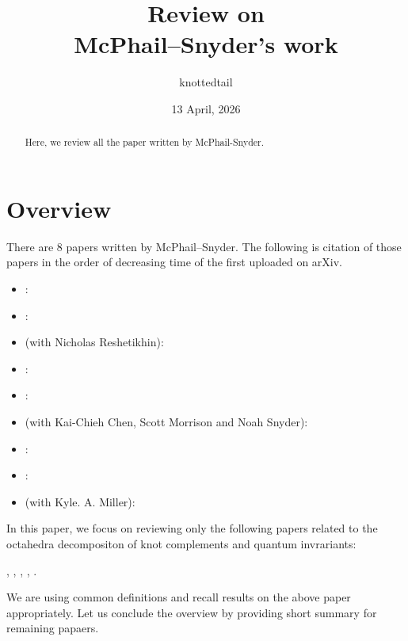 \documentclass[11pt]{amsart}
\title{Review on \\ McPhail--Snyder's work}
\author{knottedtail}
\date{13 April, 2026}
\begin{document}
\begin{abstract}
    Here, we review all the paper written by McPhail-Snyder.
\end{abstract}

\maketitle

\section{Overview}

There are 8 papers written by McPhail--Snyder.
The following is citation of those papers in the order of decreasing time of the first uploaded on arXiv.
\begin{itemize}
    \item \cite{McPhailSnyder-2026-stateintegral}: 
    \item \cite{McPhailSnyder-2025-quantization_tangle}: 
    \item \cite{McPhailSnyder_Reshetikhin-2025-cyclic_modules} (with Nicholas Reshetikhin): 
    \item \cite{McPhailSnyder-2025-octahedral_coordinates}: 
    \item \cite{McPhailSnyder-2026-hyperbolic_octa_quantum}: 
    \item \cite{Chen_McPhailSnyder_Morrison_Snyder-2021-Kashaev_Reshetikhin} (with Kai-Chieh Chen, Scott Morrison and Noah Snyder): 
    \item \cite[Thesis]{McPhailSnyder-2021-thesis}: 
    \item \cite{McPhailSnyder-2022-holonomy_torsion}: 
    \item \cite{McPhailSnyder_Miller-2020-planar_diagrams} (with Kyle. A. Miller): 
\end{itemize}

In this paper, we focus on reviewing only the following papers related to the octahedra decompositon of knot complements and quantum invrariants:
\begin{center}
    \cite{McPhailSnyder-2025-quantization_tangle}, 
    \cite{McPhailSnyder_Reshetikhin-2025-cyclic_modules}
    \cite{McPhailSnyder-2025-octahedral_coordinates},
    \cite{McPhailSnyder-2026-hyperbolic_octa_quantum}, 
    \cite{McPhailSnyder-2021-thesis},
    \cite{McPhailSnyder-2022-holonomy_torsion}.
\end{center}
We are using common definitions and recall results on the above paper appropriately.
Let us conclude the overview by providing short summary for remaining papaers.
\end{document}
